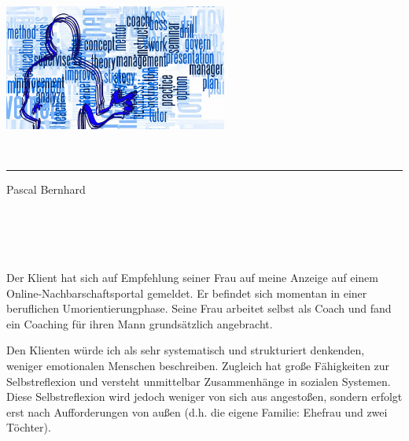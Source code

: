\documentclass[11pt,a4paper]{article}
\begin{document}
\sffamily   %
\hfill%
\begin{minipage}[t]{.6\textwidth}
\raggedleft%
\includegraphics[width=0.55\textwidth]{Coaching-Logo_1280-720.jpg}


\end{minipage}\\[0.5em]
%
{\color{firstnamecolor}\rule{\textwidth}{.25ex}}
%
\begin{minipage}[t]{.4\textwidth}
	\raggedright%
	\vspace*{1em}

	\small%
\end{minipage}
%
\hfill
%
\begin{minipage}[t]{.4\textwidth}
	\raggedleft %
	Pascal Bernhard
\end{minipage}\\[2.2em]


{\bfseries {}}\\[0.75em]

\section*{\color{MidnightBlue}{Rahmeninformationen zum Klienten}}


Der Klient hat sich auf Empfehlung seiner Frau auf meine Anzeige auf einem Online-Nachbarschaftsportal gemeldet. Er befindet sich momentan in einer beruflichen Umorientierungphase. Seine Frau arbeitet selbst als Coach und fand ein Coaching für ihren Mann grundsätzlich angebracht.

Den Klienten würde ich als sehr systematisch und strukturiert denkenden, weniger emotionalen Menschen beschreiben. Zugleich hat große Fähigkeiten zur Selbstreflexion und versteht unmittelbar Zusammenhänge in sozialen Systemen. Diese Selbstreflexion wird jedoch weniger von sich aus angestoßen, sondern erfolgt erst nach Aufforderungen von außen (d.h. die eigene Familie: Ehefrau und zwei Töchter).
\end{document}
